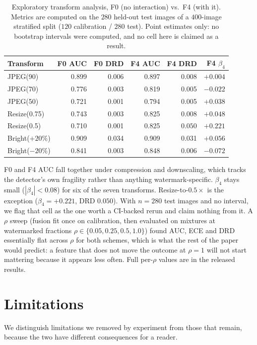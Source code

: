 \documentclass[journal]{IEEEtran}
\begin{document}
\begin{table}[t]
\centering
\caption{Exploratory transform analysis, F0 (no interaction) vs.\ F4 (with
it). Metrics are computed on the $280$ held-out test images of a $400$-image
stratified split ($120$ calibration / $280$ test). Point estimates only: no
bootstrap intervals were computed, and no cell here is claimed as a result.}
\label{tab:e4}
\footnotesize
\setlength{\tabcolsep}{3pt}
\begin{tabular}{lrrrrr}
\toprule
Transform & F0 AUC & F0 DRD & F4 AUC & F4 DRD & F4 $\beta_4$ \\
\midrule
JPEG(90)     & 0.899 & 0.006 & 0.897 & 0.008 & $+0.004$ \\
JPEG(70)     & 0.776 & 0.003 & 0.819 & 0.005 & $-0.022$ \\
JPEG(50)     & 0.721 & 0.001 & 0.794 & 0.005 & $+0.038$ \\
Resize(0.75) & 0.743 & 0.003 & 0.825 & 0.008 & $+0.048$ \\
Resize(0.5)  & 0.710 & 0.001 & 0.825 & $\mathbf{0.050}$ & $\mathbf{+0.221}$ \\
Bright($+20\%$) & 0.909 & 0.034 & 0.909 & 0.031 & $+0.056$ \\
Bright($-20\%$) & 0.841 & 0.003 & 0.848 & 0.006 & $-0.072$ \\
\bottomrule
\end{tabular}
\end{table}

F0 and F4 AUC fall together under compression and downscaling, which tracks
the detector's own fragility rather than anything watermark-specific.
$\beta_4$ stays small ($|\beta_4|<0.08$) for six of the seven transforms.
Resize-to-$0.5\times$ is the exception ($\beta_4=+0.221$, DRD $0.050$). With
$n{=}280$ test images and no interval, we flag that cell as the one worth a
CI-backed rerun and claim nothing from it. A $\rho$ sweep (fusion fit once on
calibration, then evaluated on mixtures at watermarked fractions
$\rho\in\{0.05,0.25,0.5,1.0\}$) found AUC, ECE and DRD essentially flat across
$\rho$ for both schemes, which is what the rest of the paper would predict: a
feature that does not move the outcome at $\rho{=}1$ will not start mattering
because it appears less often. Full per-$\rho$ values are in the released
results.

\section{Limitations}

We distinguish limitations we removed by experiment from those that remain,
because the two have different consequences for a reader.
\end{document}
